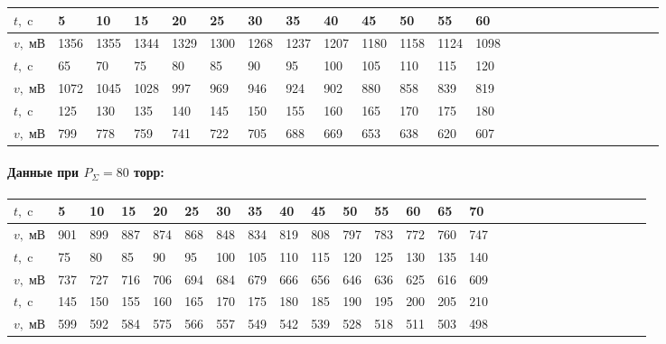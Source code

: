 \documentclass[a4paper,12pt]{article}
\begin{document}
\begin{enumerate}
\begin{center}
\begin{tabular}{|l||l|l|l|l|l|l|l|l|l|l|l|l|l|l|l|l|l|l|l|l|l|l|l|l}
\hline
$t,\; \text{c}$ & 5 & 10 & 15 & 20 & 25 & 30 & 35 & 40 & 45 & 50 & 55 & 60 \\ 
\hline
$v, \; \text{мВ}$ & 1356 & 1355 & 1344 & 1329 & 1300 & 1268 & 1237 & 1207 & 1180 & 1158 & 1124 & 1098 \\ 
\hline
\hline
$t,\; \text{c}$ & 65 & 70 & 75 & 80 & 85 & 90 & 95 & 100 & 105 & 110 & 115 & 120 \\ 
\hline
$v, \; \text{мВ}$ & 1072 & 1045 & 1028 & 997 & 969 & 946 & 924 & 902 & 880 & 858 & 839 & 819 \\ 
\hline
\hline
$t,\; \text{c}$ & 125 & 130 & 135 & 140 & 145 & 150 & 155 & 160 & 165 & 170 & 175 & 180 \\ 
\hline
$v, \; \text{мВ}$ & 799 & 778 & 759 & 741 & 722 & 705 & 688 & 669 & 653 & 638 & 620 & 607 \\ 
\hline
\end{tabular}
\end{center}

\paragraph{Данные при $P_{\Sigma} = 80$ торр:}

\begin{center}
\begin{tabular}{|l||l|l|l|l|l|l|l|l|l|l|l|l|l|l|l|l|l|l|l|l|l|l|l|l|l|l|}
\hline
$t,\; \text{c}$ & 5 & 10 & 15 & 20 & 25 & 30 & 35 & 40 & 45 & 50 & 55 & 60 & 65 & 70 \\ 
\hline
$v, \; \text{мВ}$ & 901 & 899 & 887 & 874 & 868 & 848 & 834 & 819 & 808 & 797 & 783 & 772 & 760 & 747 \\ 
\hline
\hline
$t,\; \text{c}$ & 75 & 80 & 85 & 90 & 95 & 100 & 105 & 110 & 115 & 120 & 125 & 130 & 135 & 140\\ 
\hline
$v, \; \text{мВ}$ & 737 & 727 & 716 & 706 & 694 & 684 & 679 & 666 & 656 & 646 & 636 & 625 & 616 & 609 \\ 
\hline
\hline
$t,\; \text{c}$ & 145 & 150 & 155 & 160 & 165 & 170 & 175 & 180 & 185 & 190 & 195 & 200 & 205 & 210 \\ 
\hline
$v, \; \text{мВ}$ & 599 & 592 & 584 & 575 & 566 & 557 & 549 & 542 & 539 & 528 & 518 & 511 & 503 & 498 \\ 
\hline
\end{tabular}
\end{center}


\end{enumerate}
\end{document}
